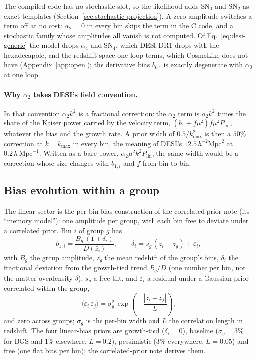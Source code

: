 \documentclass[11pt]{article}
\newcommand{\bone}{b_1}            %
\newcommand{\plin}{P_{\mathrm{lin}}}
\newcommand{\kmax}{k_{\mathrm{max}}}
\newcommand{\hMpc}{\,h\,\mathrm{Mpc}^{-1}}
\newcommand{\aunit}{\,h^{-2}\mathrm{Mpc}^2}
\newcommand{\SNz}{\mathrm{SN}_0}
\newcommand{\SNt}{\mathrm{SN}_2}
\begin{document}
The compiled code has no stochastic slot, so the likelihood adds $\SNz$
and $\SNt$ as exact templates (Section~\ref{sec:stochastic-projection}).
A zero amplitude switches a term off at no cost: $\alpha_2 = 0$ in
every bin skips the term in the C code, and a stochastic family whose
amplitudes all vanish is not computed.  Of Eq.~\eqref{eq:desi-generic}
the model drops $\alpha_4$ and $\mathrm{SN}_4$, which DESI DR1 drops
with the hexadecapole, and the redshift-space one-loop terms, which
CosmoLike does not have (Appendix~\ref{app:open}); the derivative bias
$b_{\nabla^2}$ is exactly degenerate with $\alpha_0$ at one loop.

\paragraph{Why $\alpha_2$ takes DESI's field convention.}
In that convention $\alpha_2 k^2$ is a fractional correction: the
$\alpha_2$ term is $\alpha_2 k^2$ times the share of the Kaiser power
carried by the velocity term, $(\bone + f\mu^2) f\mu^2\plin$, whatever
the bias and the growth rate.  A prior width of $0.5/\kmax^2$ is then
a $50\%$ correction at $k = \kmax$ in every bin, the meaning of DESI's
$12.5\aunit$ at $0.2\hMpc$.  Written as a bare power,
$\alpha_2\mu^2 k^2\plin$, the same width would be a correction whose
size changes with $b_{1,i}$ and $f$ from bin to bin.

\subsection{Bias evolution within a group}
\label{sec:evolution}

The linear sector is the per-bin bias construction of the
correlated-prior note (its ``memory model''): one amplitude per
group, with each bin free to
deviate under a correlated prior.  Bin $i$ of group $g$ has
\begin{equation}
b_{1,i} = \frac{B_g\,(1 + \delta_i)}{D(\bar{z}_i)} , \qquad
\delta_i = s_g\,(\bar{z}_i - \bar{z}_g) + \varepsilon_i ,
\label{eq:linear-perbin}
\end{equation}
with $B_g$ the group amplitude, $\bar{z}_g$ the mean redshift of the
group's bins, $\delta_i$ the fractional deviation from the growth-tied
trend $B_g/D$ (one number per bin, not the matter overdensity
$\delta$), $s_g$ a free tilt, and $\varepsilon_i$ a residual under
a Gaussian prior correlated within the group,
\begin{equation}
\bigl\langle \varepsilon_i\,\varepsilon_j \bigr\rangle
 = \sigma_g^2\,\exp\!\left(-\,\frac{|\bar{z}_i - \bar{z}_j|}{L}\right) ,
\label{eq:kernel}
\end{equation}
and zero across groups; $\sigma_g$ is the per-bin width and $L$ the
correlation length in redshift.  The four linear-bias priors are
growth-tied ($\delta_i = 0$), baseline ($\sigma_g = 3\%$ for BGS and
$1\%$ elsewhere, $L = 0.2$), pessimistic ($3\%$ everywhere,
$L = 0.05$) and free (one flat bias per bin); the correlated-prior note
derives them.
\end{document}
